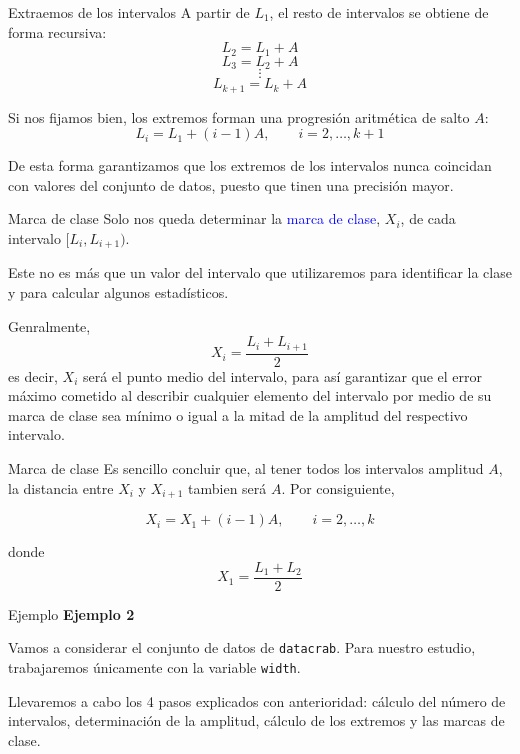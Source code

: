 \documentclass[
  ignorenonframetext,
  aspectratio=169]{beamer}
\newcommand\blue[1]{\textcolor{blue}{#1}}
\begin{document}
\begin{frame}{Extraemos de los intervalos}
\label{extraemos-de-los-intervalos}
A partir de \(L_1\), el resto de intervalos se obtiene de forma
recursiva: \[L_2 = L_1 + A\] \[L_3 = L_2 + A\] \[\vdots\]
\[L_{k+1} = L_k+A\]

Si nos fijamos bien, los extremos forman una progresión aritmética de
salto \(A\): \[L_{i} = L_{1}+(i-1)A,\qquad i=2,\dots,k+1\]

De esta forma garantizamos que los extremos de los intervalos nunca
coincidan con valores del conjunto de datos, puesto que tinen una
precisión mayor.
\end{frame}

\begin{frame}{Marca de clase}
\label{marca-de-clase}
Solo nos queda determinar la \blue{marca de clase}, \(X_i\), de cada
intervalo \([L_i,L_{i+1})\).

Este no es más que un valor del intervalo que utilizaremos para
identificar la clase y para calcular algunos estadísticos.

Genralmente, \[X_i = \frac{L_i+L_{i+1}}{2}\] es decir, \(X_i\) será el
punto medio del intervalo, para así garantizar que el error máximo
cometido al describir cualquier elemento del intervalo por medio de su
marca de clase sea mínimo o igual a la mitad de la amplitud del
respectivo intervalo.
\end{frame}

\begin{frame}{Marca de clase}
\label{marca-de-clase-1}
Es sencillo concluir que, al tener todos los intervalos amplitud \(A\),
la distancia entre \(X_i\) y \(X_{i+1}\) tambien será \(A\). Por
consiguiente,

\[X_{i} = X_1+ (i-1)A,\qquad i=2,\dots,k\]

donde \[X_1 = \frac{L_1+L_2}{2}\]
\end{frame}

\begin{frame}[fragile]{Ejemplo}
\label{ejemplo}
\textbf{Ejemplo 2}

Vamos a considerar el conjunto de datos de \texttt{datacrab}. Para
nuestro estudio, trabajaremos únicamente con la variable \texttt{width}.

Llevaremos a cabo los 4 pasos explicados con anterioridad: cálculo del
número de intervalos, determinación de la amplitud, cálculo de los
extremos y las marcas de clase.
\end{frame}
\end{document}
